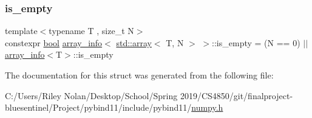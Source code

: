 \mbox{\label{structarray__info_3_01std_1_1array_3_01_t_00_01_n_01_4_01_4_a95b6d29fee19cde4837d3a2f62d51e00}} 
\subsubsection{\texorpdfstring{is\_empty}{is\_empty}}
{\footnotesize\ttfamily template$<$typename T , size\+\_\+t N$>$ \\
constexpr \mbox{\hyperlink{asdl_8h_af6a258d8f3ee5206d682d799316314b1}{bool}} \mbox{\hyperlink{structarray__info}{array\+\_\+info}}$<$ \mbox{\hyperlink{_s_d_l__opengl__glext_8h_a52f38e7d822a46377fde7a02708eedb1}{std\+::array}}$<$ T, N $>$ $>$\+::is\+\_\+empty = (N == 0) $\vert$$\vert$ \mbox{\hyperlink{structarray__info}{array\+\_\+info}}$<$T$>$\+::is\+\_\+empty\hspace{0.3cm}{\ttfamily [static]}}



The documentation for this struct was generated from the following file\+:\begin{DoxyCompactItemize}
\item 
C\+:/\+Users/\+Riley Nolan/\+Desktop/\+School/\+Spring 2019/\+C\+S4850/git/finalproject-\/bluesentinel/\+Project/pybind11/include/pybind11/\mbox{\hyperlink{numpy_8h}{numpy.\+h}}\end{DoxyCompactItemize}
